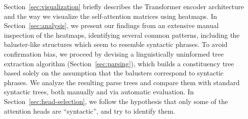 \documentclass[11pt,a4paper]{article}
\def\RR#1{{\color{blue}RR: \it #1}}
\def\DM#1{{\color{red}DM: \it #1}}
\def\JL#1{{\color{magenta}JL: \it #1}}
\def\DEL#1{{\color{green}SMAZAT: \it #1}}
\def\JL#1{}
\def\RR#1{}
\def\DM#1{}
\def\DEL#1{}
\begin{document}
Section~\ref{sec:visualization} briefly describes the Transformer encoder architecture and the way we
visualize the self-attention matrices using heatmaps.
In Section~\ref{sec:analysis}, we present our findings from an extensive manual inspection of the
heatmaps, identifying several common patterns, including the baluster-like
structures which seem to resemble syntactic phrases.
To avoid
confirmation bias, we proceed by devising a
linguistically uninformed tree extraction algorithm
(Section~\ref{sec:parsing}), which
builds a constituency tree
based solely on the assumption that the balusters
correspond to syntactic phrases.
We analyze the resulting parse trees and compare them with standard
syntactic
trees, both manually and via automatic evaluation. %
%
In Section~\ref{sec:head-selection}, we follow the hypothesis that only some of the attention heads
are ``syntactic'', and try to identify them.

\DEL{ both supervisedly and heuristically
in Section~\ref{sec:head-selection},
but we do note that we may now again be performing wishful observations, as we
are seeking for the syntax quite eagerly. \JL{týhle větě nerozumim}}
\end{document}

